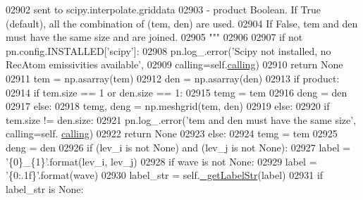 \begin{DoxyCode}
02902 \textcolor{stringliteral}{                             sent to scipy.interpolate.griddata    }
02903 \textcolor{stringliteral}{            - product        Boolean. If True (default), all the combination of (tem, den) are used. }
02904 \textcolor{stringliteral}{                             If False, tem and den must have the same size and are joined.}
02905 \textcolor{stringliteral}{        """}
02906         
02907         \textcolor{keywordflow}{if} \textcolor{keywordflow}{not} pn.config.INSTALLED[\textcolor{stringliteral}{'scipy'}]:
02908             pn.log\_.error(\textcolor{stringliteral}{'Scipy not installed, no RecAtom emissivities available'},
02909                           calling=self.\hyperlink{classpyneb_1_1core_1_1pynebcore_1_1_rec_atom_a82ec425ebba32b73a5d9ae52717d47c4}{calling})
02910             \textcolor{keywordflow}{return} \textcolor{keywordtype}{None}
02911         tem = np.asarray(tem)
02912         den = np.asarray(den)
02913         \textcolor{keywordflow}{if} product:
02914             \textcolor{keywordflow}{if} tem.size == 1 \textcolor{keywordflow}{or} den.size == 1:
02915                 temg = tem
02916                 deng = den
02917             \textcolor{keywordflow}{else}:
02918                 temg, deng = np.meshgrid(tem, den)
02919         \textcolor{keywordflow}{else}:
02920             \textcolor{keywordflow}{if} tem.size != den.size:
02921                 pn.log\_.error(\textcolor{stringliteral}{'tem and den must have the same size'}, calling=self.
      \hyperlink{classpyneb_1_1core_1_1pynebcore_1_1_rec_atom_a82ec425ebba32b73a5d9ae52717d47c4}{calling})
02922                 \textcolor{keywordflow}{return} \textcolor{keywordtype}{None}
02923             \textcolor{keywordflow}{else}:
02924                 temg = tem
02925                 deng = den
02926         \textcolor{keywordflow}{if} (lev\_i \textcolor{keywordflow}{is} \textcolor{keywordflow}{not} \textcolor{keywordtype}{None}) \textcolor{keywordflow}{and} (lev\_j \textcolor{keywordflow}{is} \textcolor{keywordflow}{not} \textcolor{keywordtype}{None}):
02927             label = \textcolor{stringliteral}{'\{0\}\_\{1\}'}.format(lev\_i, lev\_j)
02928         \textcolor{keywordflow}{if} wave \textcolor{keywordflow}{is} \textcolor{keywordflow}{not} \textcolor{keywordtype}{None}:
02929             label = \textcolor{stringliteral}{'\{0:.1f\}'}.format(wave)
02930         label\_str = self.\hyperlink{classpyneb_1_1core_1_1pynebcore_1_1_rec_atom_ad235d43c967836595e501959f2c7c575}{\_getLabelStr}(label)
02931         \textcolor{keywordflow}{if} label\_str \textcolor{keywordflow}{is} \textcolor{keywordtype}{None}:

\end{DoxyCode}
